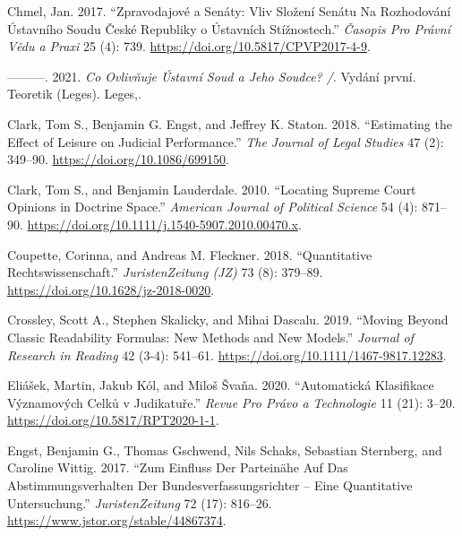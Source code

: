 \documentclass[
  11pt,
]{article}
\newlength{\cslhangindent}
\newenvironment{CSLReferences}[2] %
 {%
  \setlength{\parindent}{0pt}
  \ifodd #1 \everypar{\setlength{\hangindent}{\cslhangindent}}\ignorespaces\fi
  \ifnum #2 > 0
  \setlength{\parskip}{#2\baselineskip}
  \fi
 }%
 {}
\begin{document}
\begin{CSLReferences}{1}{0}
\leavevmode{}%
Chmel, Jan. 2017. {``Zpravodajové a Senáty: {Vliv} Složení Senátu Na
Rozhodování {Ústavního} Soudu {České} Republiky o Ústavních
Stížnostech.''} \emph{Časopis Pro Právní Vědu a Praxi} 25 (4): 739.
\url{https://doi.org/10.5817/CPVP2017-4-9}.

\leavevmode{}%
---------. 2021. \emph{Co Ovlivňuje {Ústavní} Soud a Jeho Soudce? /}.
Vydání první. Teoretik ({Leges}). {Leges,}.

\leavevmode{}%
Clark, Tom S., Benjamin G. Engst, and Jeffrey K. Staton. 2018.
{``Estimating the {Effect} of {Leisure} on {Judicial Performance}.''}
\emph{The Journal of Legal Studies} 47 (2): 349--90.
\url{https://doi.org/10.1086/699150}.

\leavevmode{}%
Clark, Tom S., and Benjamin Lauderdale. 2010. {``Locating {Supreme Court
Opinions} in {Doctrine Space}.''} \emph{American Journal of Political
Science} 54 (4): 871--90.
\url{https://doi.org/10.1111/j.1540-5907.2010.00470.x}.

\leavevmode{}%
Coupette, Corinna, and Andreas M. Fleckner. 2018. {``Quantitative
{Rechtswissenschaft}.''} \emph{JuristenZeitung (JZ)} 73 (8): 379--89.
\url{https://doi.org/10.1628/jz-2018-0020}.

\leavevmode{}%
Crossley, Scott A., Stephen Skalicky, and Mihai Dascalu. 2019. {``Moving
Beyond Classic Readability Formulas: New Methods and New Models.''}
\emph{Journal of Research in Reading} 42 (3-4): 541--61.
\url{https://doi.org/10.1111/1467-9817.12283}.

\leavevmode{}%
Eliášek, Martin, Jakub Kól, and Miloš Švaňa. 2020. {``Automatická
Klasifikace Významových Celků v Judikatuře.''} \emph{Revue Pro Právo a
Technologie} 11 (21): 3--20. \url{https://doi.org/10.5817/RPT2020-1-1}.

\leavevmode{}%
Engst, Benjamin G., Thomas Gschwend, Nils Schaks, Sebastian Sternberg,
and Caroline Wittig. 2017. {``Zum {Einfluss} Der {Parteinähe} Auf Das
{Abstimmungsverhalten} Der {Bundesverfassungsrichter} -- Eine
Quantitative {Untersuchung}.''} \emph{JuristenZeitung} 72 (17): 816--26.
\url{https://www.jstor.org/stable/44867374}.


\end{CSLReferences}
\end{document}
